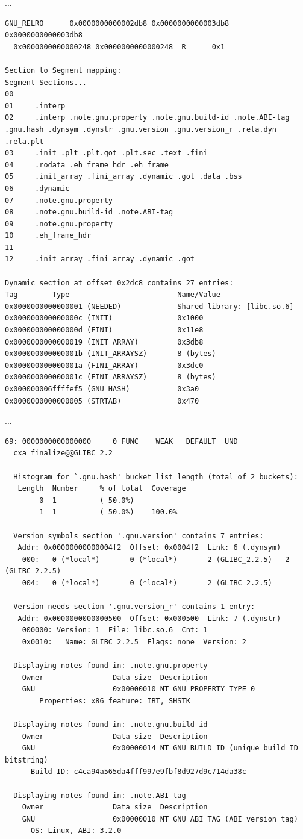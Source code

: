 \documentclass[]{project_plan}
\begin{document}
...
\begin{lstlisting}[basicstyle=\tiny]
  GNU_RELRO      0x0000000000002db8 0x0000000000003db8 0x0000000000003db8
  0x0000000000000248 0x0000000000000248  R      0x1

Section to Segment mapping:
Segment Sections...
00
01     .interp
02     .interp .note.gnu.property .note.gnu.build-id .note.ABI-tag .gnu.hash .dynsym .dynstr .gnu.version .gnu.version_r .rela.dyn .rela.plt
03     .init .plt .plt.got .plt.sec .text .fini
04     .rodata .eh_frame_hdr .eh_frame
05     .init_array .fini_array .dynamic .got .data .bss
06     .dynamic
07     .note.gnu.property
08     .note.gnu.build-id .note.ABI-tag
09     .note.gnu.property
10     .eh_frame_hdr
11
12     .init_array .fini_array .dynamic .got

Dynamic section at offset 0x2dc8 contains 27 entries:
Tag        Type                         Name/Value
0x0000000000000001 (NEEDED)             Shared library: [libc.so.6]
0x000000000000000c (INIT)               0x1000
0x000000000000000d (FINI)               0x11e8
0x0000000000000019 (INIT_ARRAY)         0x3db8
0x000000000000001b (INIT_ARRAYSZ)       8 (bytes)
0x000000000000001a (FINI_ARRAY)         0x3dc0
0x000000000000001c (FINI_ARRAYSZ)       8 (bytes)
0x000000006ffffef5 (GNU_HASH)           0x3a0
0x0000000000000005 (STRTAB)             0x470
\end{lstlisting}
...
\begin{lstlisting}[basicstyle=\tiny]
  69: 0000000000000000     0 FUNC    WEAK   DEFAULT  UND __cxa_finalize@@GLIBC_2.2

  Histogram for `.gnu.hash' bucket list length (total of 2 buckets):
   Length  Number     % of total  Coverage
        0  1          ( 50.0%)
        1  1          ( 50.0%)    100.0%

  Version symbols section '.gnu.version' contains 7 entries:
   Addr: 0x00000000000004f2  Offset: 0x0004f2  Link: 6 (.dynsym)
    000:   0 (*local*)       0 (*local*)       2 (GLIBC_2.2.5)   2 (GLIBC_2.2.5)
    004:   0 (*local*)       0 (*local*)       2 (GLIBC_2.2.5)

  Version needs section '.gnu.version_r' contains 1 entry:
   Addr: 0x0000000000000500  Offset: 0x000500  Link: 7 (.dynstr)
    000000: Version: 1  File: libc.so.6  Cnt: 1
    0x0010:   Name: GLIBC_2.2.5  Flags: none  Version: 2

  Displaying notes found in: .note.gnu.property
    Owner                Data size 	Description
    GNU                  0x00000010	NT_GNU_PROPERTY_TYPE_0
        Properties: x86 feature: IBT, SHSTK

  Displaying notes found in: .note.gnu.build-id
    Owner                Data size 	Description
    GNU                  0x00000014	NT_GNU_BUILD_ID (unique build ID bitstring)
      Build ID: c4ca94a565da4fff997e9fbf8d927d9c714da38c

  Displaying notes found in: .note.ABI-tag
    Owner                Data size 	Description
    GNU                  0x00000010	NT_GNU_ABI_TAG (ABI version tag)
      OS: Linux, ABI: 3.2.0
\end{lstlisting}
\end{document}
